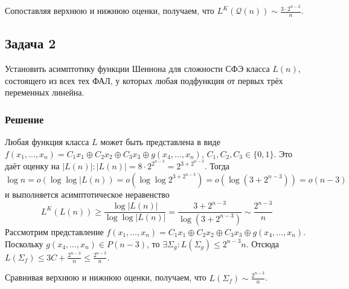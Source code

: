 \documentclass[11pt]{article}
\newcounter{th}\setcounter{th}{0}
\begin{document}
Сопоставляя верхнюю и нижнюю оценки, получаем, что \(L^K(\mathcal{Q}(n)) \sim \frac{3\cdot2^{n - 2}}n\).
\subsection{Задача 2}
\label{sec:orga2d4e90}
Установить асимптотику функции Шеннона для сложности СФЭ класса \(L(n)\), состоящего из всех тех ФАЛ, у
которых любая подфункция от первых трёх переменных линейна.
\subsubsection{Решение}
\label{sec:org102fb1b}
Любая функция класса \(L\) может быть представлена в виде
\(f(x_1, \ldots, x_n) = C_1x_1 \oplus C_2x_2 \oplus C_3x_3 \oplus g(x_4, \ldots, x_n)\),
\(C_1, C_2, C_3 \in \{0, 1\}\).
Это даёт оценку на \(|L(n)|: |L(n)| = 8\cdot2^{2^{n - 3}} = 2^{3 + 2^{n - 3}}\). Тогда
\begin{equation*}
\log n = o(\log\log|L(n)) = o(\log\log2^{3 + 2^{n - 3}}) = o(\log(3 + 2^{n - 3})) = o(n - 3)
\end{equation*}
и выполняется асимптотическое неравенство
\begin{equation*}
L^K(L(n)) \geq \frac{\log|L(n)|}{\log\log|L(n)|} = \frac{3 + 2^{n - 3}}{\log (3 + 2^{n - 3})}
\sim \frac{2^{n - 3}}n
\end{equation*}
Рассмотрим представление
\(f(x_1, \ldots, x_n) = C_1x_1\oplus C_2x_2\oplus C_3x_3\oplus g(x_4, \ldots, x_n)\). Поскольку
\(g(x_4, \ldots, x_n) \in P(n - 3)\), то \(\exists \Sigma_g: L(\Sigma_g) \leq 2^{n - 3}n\). Отсюда
\(L(\Sigma_f) \leq 3C + \frac{2^{n - 3}}n \leq \frac{2^{n - 3}}n\).

Сравнивая верхнюю и нижнюю оценки, получаем, что \(L(\Sigma_f) \sim \frac{2^{n - 3}}n\).
\end{document}
